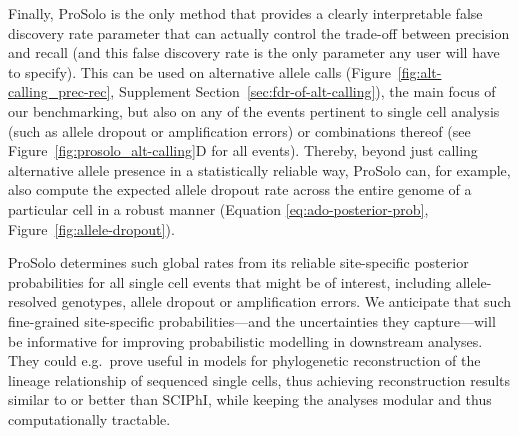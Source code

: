 \documentclass[12pt,inline]{wlscirep}
\begin{document}
Finally, ProSolo is the only method that provides a clearly interpretable false discovery rate parameter that can actually control the trade-off between precision and recall (and this false discovery rate is the only parameter any user will have to specify).
This can be used on alternative allele calls (Figure~\ref{fig:alt-calling_prec-rec}, Supplement Section~\ref{sec:fdr-of-alt-calling}), the main focus of our benchmarking, but also on any of the events pertinent to single cell analysis (such as allele dropout or amplification errors) or combinations thereof (see Figure~\ref{fig:prosolo_alt-calling}D for all events).
Thereby, beyond just calling alternative allele presence in a statistically reliable way, ProSolo can, for example, also compute the expected allele dropout rate across the entire genome of a particular cell in a robust manner (Equation \ref{eq:ado-posterior-prob}, Figure~\ref{fig:allele-dropout}).

ProSolo determines such global rates from its reliable site-specific posterior probabilities for all single cell events that might be of interest, including allele-resolved genotypes, allele dropout or amplification errors. 
We anticipate that such fine-grained site-specific probabilities---and the uncertainties they capture---will be informative for improving probabilistic modelling in downstream analyses.
They could e.g.~prove useful in models for phylogenetic reconstruction of the lineage relationship of sequenced single cells\cite{singer_single-cell_2018,zafar_siclonefit:_2018,koptagel_scuphr:_2018}, thus achieving reconstruction results similar to or better than SCIPhI, while keeping the analyses modular and thus computationally tractable\cite{lahnemann_eleven_2020}.
\end{document}
